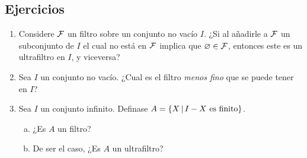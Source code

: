 \subsection{Ejercicios}

\begin{enumerate}[1.]
  \item Considere $\mathcal{F}$ un filtro sobre un conjunto no vacío $I$. ¿Si al
        añadirle a $\mathcal{F}$ un subconjunto de $I$ el cual no está en $\mathcal{F}$ implica
        que $\varnothing \in \mathcal{F}$, entonces este es un ultrafiltro en $I$, y
        viceversa?
  \item Sea $I$ un conjunto no vacío. ¿Cual es el filtro \emph{menos fino} que
        se puede tener en $I$?
  \item Sea $I$ un conjunto infinito. Definase $A = \left\{X\,\middle|\,I-X \text{ es finito}\right\}$.
  \begin{enumerate}[a.]
    \item ¿Es $A$ un filtro?
    \item De ser el caso, ¿Es $A$ un ultrafiltro?
  \end{enumerate}
\end{enumerate}